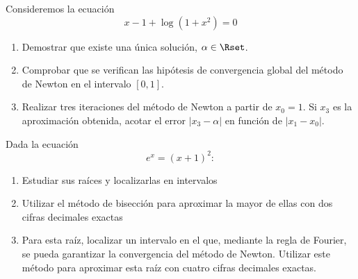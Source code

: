 \documentclass[11pt]{article}
\begin{document}
\begin{problemas}
\begin{problema}
   \end{problema}
  

   \begin{problema}
     Consideremos la ecuación
     $$
     x-1 + \log(1+x^2) = 0
     $$
     \begin{enumerate}
     \item Demostrar que existe una única solución, $\alpha\in\Rset$.
     \item Comprobar que se verifican las hipótesis de convergencia
       global del método de Newton en el intervalo $[0,1]$.
     \item Realizar tres iteraciones del método de Newton a partir de
       $x_0=1$. Si $x_3$ es la aproximación obtenida, acotar el error
       $|x_3-\alpha|$ en función de $|x_1-x_0|$.
     \end{enumerate}
   \end{problema}

   \begin{problema}
     Dada la ecuación $$e^x=(x+1)^2:$$
     \begin{enumerate}
     \item Estudiar sus raíces y localizarlas en intervalos
     \item Utilizar el método de bisección para aproximar la mayor de
       ellas con dos cifras decimales exactas
     \item Para esta raíz, localizar un intervalo en el que, mediante
       la regla de Fourier, se pueda garantizar la convergencia del
       método de Newton. Utilizar este método para aproximar esta raíz
       con cuatro cifras decimales exactas.
     \end{enumerate}
   \end{problema}
  \end{problemas}
  
\end{document}
